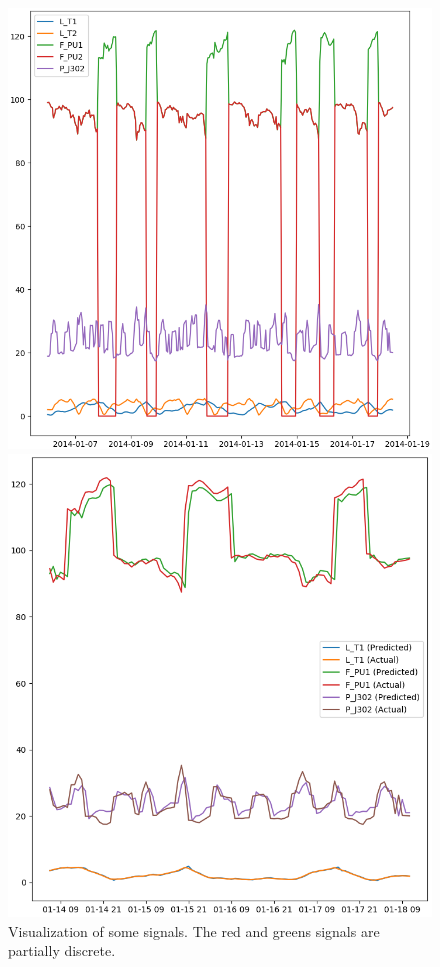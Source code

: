 \documentclass[]{article}
\begin{document}
\begin{figure}[H]
\begin{minipage}{.5\textwidth}
  \includegraphics[width=0.8\linewidth, keepaspectratio]{./visuallizations/signals.png}
  \caption{Visualization of some signals. The red and greens signals are partially discrete.}
  \label{signals}
\end{minipage} %
\begin{minipage}{.5\textwidth}
  \includegraphics[width=0.8\linewidth, keepaspectratio]{./visuallizations/predictions.png}

\end{minipage}
\end{figure}
\end{document}
